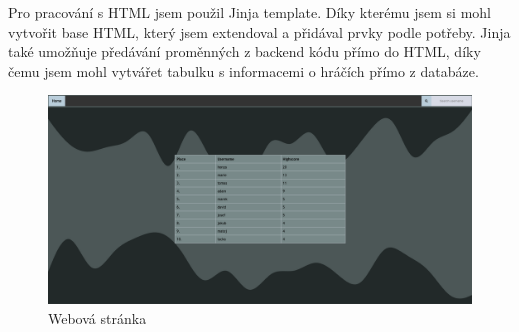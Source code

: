 Pro pracování s HTML jsem použil Jinja template. Díky kterému jsem si mohl vytvořit base HTML, který jsem extendoval a přidával prvky podle potřeby. Jinja také umožňuje předávání proměnných z backend kódu přímo do HTML, díky čemu jsem mohl vytvářet tabulku s informacemi o hráčích přímo z databáze. 


\begin{figure}[ht!]
    \centering
    \includegraphics[scale=0.2]{images/Screenshot from 2022-04-27 20-57-42.png}
    \caption{Webová stránka}
\end{figure}